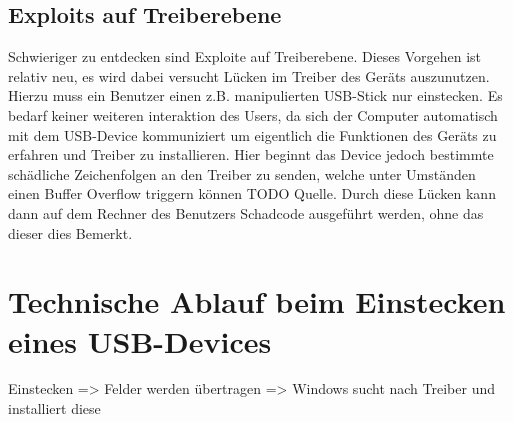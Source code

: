 \subsection{Exploits auf Treiberebene}
Schwieriger zu entdecken sind Exploite auf Treiberebene. Dieses Vorgehen ist relativ neu, es wird dabei versucht Lücken im Treiber des Geräts auszunutzen. Hierzu muss ein Benutzer einen z.B. manipulierten USB-Stick nur einstecken. Es bedarf keiner weiteren interaktion des Users, da sich der Computer automatisch mit dem USB-Device kommuniziert um eigentlich die Funktionen des Geräts zu erfahren und Treiber zu installieren. Hier beginnt das Device jedoch bestimmte schädliche Zeichenfolgen an den Treiber zu senden, welche unter Umständen einen Buffer Overflow triggern können TODO Quelle. Durch diese Lücken kann dann auf dem Rechner des Benutzers Schadcode ausgeführt werden, ohne das dieser dies Bemerkt.


\section{Technische Ablauf beim Einstecken eines USB-Devices}
Einstecken => Felder werden übertragen => Windows sucht nach Treiber und installiert diese

